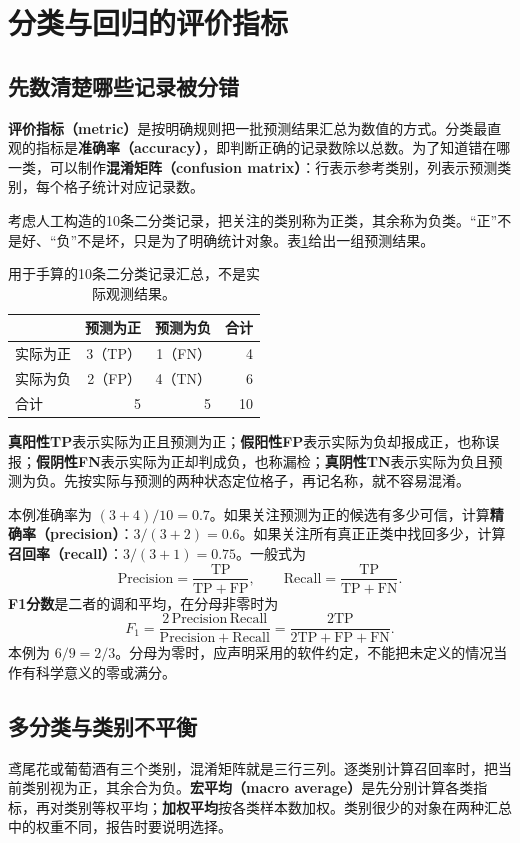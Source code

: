 \section{分类与回归的评价指标}
\subsection{先数清楚哪些记录被分错}
\textbf{评价指标（metric）}是按明确规则把一批预测结果汇总为数值的方式。分类最直观的指标是\textbf{准确率（accuracy）}，即判断正确的记录数除以总数。为了知道错在哪一类，可以制作\textbf{混淆矩阵（confusion matrix）}：行表示参考类别，列表示预测类别，每个格子统计对应记录数。

考虑人工构造的10条二分类记录，把关注的类别称为正类，其余称为负类。“正”不是好、“负”不是坏，只是为了明确统计对象。表\ref{tab:confusion-hand}给出一组预测结果。
\begin{table}[htbp]\centering
\caption{用于手算的10条二分类记录汇总，不是实际观测结果。}\label{tab:confusion-hand}
\begin{tabular}{lrrr}\toprule
&预测为正&预测为负&合计\\\midrule
实际为正&3（TP）&1（FN）&4\\
实际为负&2（FP）&4（TN）&6\\\midrule
合计&5&5&10\\\bottomrule
\end{tabular}\end{table}

\textbf{真阳性TP}表示实际为正且预测为正；\textbf{假阳性FP}表示实际为负却报成正，也称误报；\textbf{假阴性FN}表示实际为正却判成负，也称漏检；\textbf{真阴性TN}表示实际为负且预测为负。先按实际与预测的两种状态定位格子，再记名称，就不容易混淆。

本例准确率为 $(3+4)/10=0.7$。如果关注预测为正的候选有多少可信，计算\textbf{精确率（precision）}：$3/(3+2)=0.6$。如果关注所有真正正类中找回多少，计算\textbf{召回率（recall）}：$3/(3+1)=0.75$。一般式为
\[
\mathrm{Precision}=\frac{\mathrm{TP}}{\mathrm{TP}+\mathrm{FP}},\qquad
\mathrm{Recall}=\frac{\mathrm{TP}}{\mathrm{TP}+\mathrm{FN}}.
\]
\textbf{F1分数}是二者的调和平均，在分母非零时为
\[
F_1=\frac{2\,\mathrm{Precision}\,\mathrm{Recall}}{\mathrm{Precision}+\mathrm{Recall}}
=\frac{2\mathrm{TP}}{2\mathrm{TP}+\mathrm{FP}+\mathrm{FN}}.
\]
本例为 $6/9=2/3$。分母为零时，应声明采用的软件约定，不能把未定义的情况当作有科学意义的零或满分。

\subsection{多分类与类别不平衡}
鸢尾花或葡萄酒有三个类别，混淆矩阵就是三行三列。逐类别计算召回率时，把当前类别视为正，其余合为负。\textbf{宏平均（macro average）}是先分别计算各类指标，再对类别等权平均；\textbf{加权平均}按各类样本数加权。类别很少的对象在两种汇总中的权重不同，报告时要说明选择。

